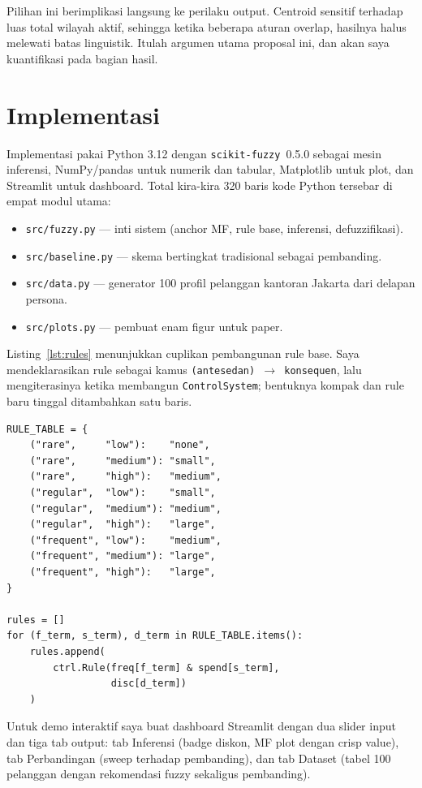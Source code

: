 \documentclass[conference]{IEEEtran}
\begin{document}
Pilihan ini berimplikasi langsung ke perilaku output. Centroid sensitif
terhadap luas total wilayah aktif, sehingga ketika beberapa aturan
overlap, hasilnya halus melewati batas linguistik. Itulah argumen utama
proposal ini, dan akan saya kuantifikasi pada bagian hasil.

\section{Implementasi}

Implementasi pakai Python 3.12 dengan \texttt{scikit-fuzzy}~0.5.0 sebagai
mesin inferensi, NumPy/pandas untuk numerik dan tabular, Matplotlib untuk
plot, dan Streamlit untuk dashboard. Total kira-kira 320 baris kode
Python tersebar di empat modul utama:

\begin{itemize}
\item \texttt{src/fuzzy.py} --- inti sistem (anchor MF, rule base,
inferensi, defuzzifikasi).
\item \texttt{src/baseline.py} --- skema bertingkat tradisional sebagai
pembanding.
\item \texttt{src/data.py} --- generator 100 profil pelanggan kantoran
Jakarta dari delapan persona.
\item \texttt{src/plots.py} --- pembuat enam figur untuk paper.
\end{itemize}

Listing~\ref{lst:rules} menunjukkan cuplikan pembangunan rule base.
Saya mendeklarasikan rule sebagai kamus
\texttt{(antesedan) $\to$ konsequen}, lalu mengiterasinya ketika membangun
\texttt{ControlSystem}; bentuknya kompak dan rule baru tinggal ditambahkan
satu baris.

\begin{lstlisting}[caption={Cuplikan pembangunan rule base.},label={lst:rules}]
RULE_TABLE = {
    ("rare",     "low"):    "none",
    ("rare",     "medium"): "small",
    ("rare",     "high"):   "medium",
    ("regular",  "low"):    "small",
    ("regular",  "medium"): "medium",
    ("regular",  "high"):   "large",
    ("frequent", "low"):    "medium",
    ("frequent", "medium"): "large",
    ("frequent", "high"):   "large",
}

rules = []
for (f_term, s_term), d_term in RULE_TABLE.items():
    rules.append(
        ctrl.Rule(freq[f_term] & spend[s_term],
                  disc[d_term])
    )
\end{lstlisting}

Untuk demo interaktif saya buat dashboard Streamlit dengan dua slider
input dan tiga tab output: tab Inferensi (badge diskon, MF plot dengan
crisp value), tab Perbandingan (sweep terhadap pembanding), dan tab
Dataset (tabel 100 pelanggan dengan rekomendasi fuzzy sekaligus
pembanding).
\end{document}
